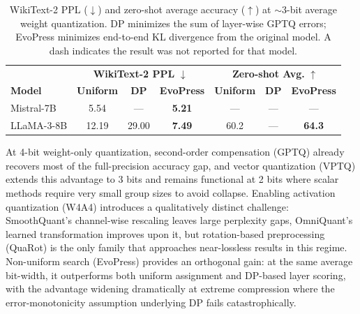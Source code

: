 \begin{table}[htbp]
\centering
\caption[EvoPress non-uniform quantization results]{WikiText-2 PPL ($\downarrow$) and zero-shot average accuracy ($\uparrow$) at $\sim$3-bit average weight quantization. DP minimizes the sum of layer-wise GPTQ errors; EvoPress minimizes end-to-end KL divergence from the original model. A dash indicates the result was not reported for that model.}
\label{tab:evopress-search}
\begin{tabular}{lcccccc}
  \toprule
  & \multicolumn{3}{c}{\textbf{WikiText-2 PPL} $\downarrow$} & \multicolumn{3}{c}{\textbf{Zero-shot Avg.} $\uparrow$} \\
  \textbf{Model} & \textbf{Uniform} & \textbf{DP} & \textbf{EvoPress} & \textbf{Uniform} & \textbf{DP} & \textbf{EvoPress} \\
  \midrule
  Mistral-7B  & 5.54  & —     & \textbf{5.21} & — & — & — \\
  LLaMA-3-8B  & 12.19 & 29.00 & \textbf{7.49} & 60.2 & — & \textbf{64.3} \\
  \bottomrule
\end{tabular}
\end{table}

At 4-bit weight-only quantization, second-order compensation (GPTQ) already recovers most of the full-precision accuracy gap, and vector quantization (VPTQ) extends this advantage to 3 bits and remains functional at 2 bits where scalar methods require very small group sizes to avoid collapse. Enabling activation quantization (W4A4) introduces a qualitatively distinct challenge: SmoothQuant's channel-wise rescaling leaves large perplexity gaps, OmniQuant's learned transformation improves upon it, but rotation-based preprocessing (QuaRot) is the only family that approaches near-lossless results in this regime. Non-uniform search (EvoPress) provides an orthogonal gain: at the same average bit-width, it outperforms both uniform assignment and DP-based layer scoring, with the advantage widening dramatically at extreme compression where the error-monotonicity assumption underlying DP fails catastrophically.


